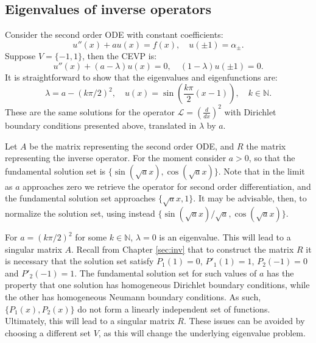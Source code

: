 \documentclass{sfuthesis}
\begin{document}

\subsection{Eigenvalues of inverse operators}

Consider the second order ODE with constant coefficients:
\begin{equation}
u''(x) + a u(x) = f(x), \quad u(\pm 1) = \alpha_{\pm}.
\end{equation}
Suppose $V = \{ -1, 1 \}$, then the CEVP is:
\begin{equation}
u''(x) + (a - \lambda) u(x) = 0, \quad (1 - \lambda) u(\pm 1) = 0.
\end{equation}
It is straightforward to show that the eigenvalues and eigenfunctions are:
\begin{equation}
\lambda = a - (k \pi/2)^2, \quad u(x) = \sin \left ( \frac{k \pi}{2} (x - 1) \right ), \quad k \in \mathbb{N}.
\end{equation}
These are the same solutions for the operator $\mathcal{L} = \left ( \frac{d}{dx} \right )^2$ with Dirichlet boundary conditions presented above, translated in $\lambda$ by $a$.

Let $A$ be the matrix representing the second order ODE, and $R$ the matrix representing the inverse operator.
For the moment consider $a>0$, so that the fundamental solution set is $\{ \sin (\sqrt{a} x), \cos (\sqrt{a} x) \}$.
Note that in the limit as $a$ approaches zero we retrieve the operator for second order differentiation, and the fundamental solution set approaches $\{ \sqrt{a} x, 1\}$.
It may be advisable, then, to normalize the solution set, using instead $\{ \sin (\sqrt{a} x)/\sqrt{a}, \cos (\sqrt{a} x) \}$.

For $a = (k \pi/2)^2$ for some $k \in \mathbb{N}$, $\lambda = 0$ is an eigenvalue.
This will lead to a singular matrix $A$.
Recall from Chapter \ref{sec:inv} that to construct the matrix $R$ it is necessary that the solution set satisfy $P_1(1) = 0$, $P'_1(1) = 1$, $P_2(-1) = 0$ and $P'_2(-1) = 1$.
The fundamental solution set for such values of $a$ has the property that one solution has homogeneous Dirichlet boundary conditions, 
while the other has homogeneous Neumann boundary conditions.
As such, $\{ P_1(x), P_2(x) \}$ do not form a linearly independent set of functions.
Ultimately, this will lead to a singular matrix $R$.
These issues can be avoided by choosing a different set $V$, as this will change the underlying eigenvalue problem.
\end{document}
